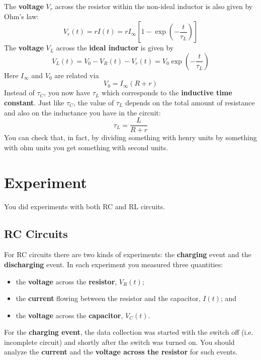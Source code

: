 The \textbf{voltage} $V_{r}$ across the resistor within the non-ideal inductor is also given by Ohm's law:
\begin{equation}
    V_{r}(t) = r I(t) = r I_{\infty} \left[ 1 - \exp\left(- \frac{t}{\tau_{L}}\right) \right]
    \label{eq.05.RL.vr}
\end{equation}
The \textbf{voltage} $V_{L}$ across the \textbf{ideal inductor} is given by
\begin{equation}
    V_{L}(t) = V_{0} - V_{R}(t) - V_{r}(t) = V_{0} \exp\left(- \frac{t}{\tau_{L}}\right)
    \label{eq.05.RL.vL}
\end{equation}
Here $I_{\infty}$ and $V_{0}$ are related via
\begin{equation}
    V_{0} = I_{\infty} \left(R + r\right)
\end{equation}
Instead of $\tau_{C}$, you now have $\tau_{L}$ which corresponds to the \textbf{inductive time constant}. Just like $\tau_{C}$, the value of $\tau_{L}$ depends on the total amount of resistance and also on the inductance you have in the circuit:
\begin{equation}
    \tau_{L} = \frac{L}{R + r}
    \label{eq.05.tauL}
\end{equation}
You can check that, in fact, by dividing something with henry units by something with ohm units you get something with second units.
%
\section{Experiment}
%
You did experiments with both RC and RL circuits.
%
\subsection{RC Circuits}
%
For RC circuits there are two kinds of experiments: the \textbf{charging} event and the \textbf{discharging} event. In each experiment you measured three quantities:
\begin{itemize}
    \item the \textbf{voltage} across the \textbf{resistor}, $V_{R}(t)$;
    \item the \textbf{current} flowing between the resistor and the capacitor, $I(t)$; and
    \item the \textbf{voltage} across the \textbf{capacitor}, $V_{C}(t)$.
\end{itemize}
For the \textbf{charging event}, the data collection was started with the switch off (i.e. incomplete circuit) and shortly after the switch was turned on. You should analyze the \textbf{current} and the \textbf{voltage across the resistor} for such events.

